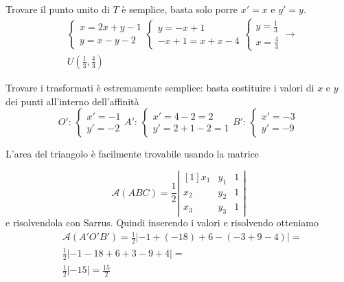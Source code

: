 Trovare il punto unito di $T$ è semplice, basta solo porre $x'=x$ e $y'=y$.
\begin{align*}
&\begin{cases}
x=2x+y-1\\
y=x-y-2
\end{cases}
\begin{cases}
y = -x+1\\
-x+1=x+x-4
\end{cases}
\begin{cases}
y=\frac{1}{3}\\
x=\frac{4}{3}
\end{cases}\rightarrow \\&U\left(\frac{1}{3},\frac{4}{3}\right)
\end{align*}

Trovare i trasformati è estremamente semplice: basta sostituire i valori di $x$ e $y$ dei punti
all'interno dell'affinità
\begin{equation*}
\boxed{
O':\,\begin{cases}
x'=-1\\y'=-2
\end{cases}
A':\,\begin{cases}
x'=4-2=2\\
y'=2+1-2=1
\end{cases}
B':\,\begin{cases}
x'=-3\\
y'=-9
\end{cases}
}	
\end{equation*}

L'area del triangolo è facilmente trovabile usando la matrice

\begin{equation*}
\mathscr{A}(ABC) = \frac{1}{2}\left\lvert 
\begin{matrix}[1]
x_1 & y_1 & 1\\
x_2 & y_2 & 1\\
x_3 & y_3 & 1
\end{matrix}\right\rvert
\end{equation*}
e risolvendola con Sarrus. Quindi inserendo i valori e risolvendo otteniamo
\begin{align*}
&\mathscr{A}(A'O'B') = \frac{1}{2}\left\lvert 
-1+(-18)+6-(-3+9-4)\right\rvert = \\&\frac{1}{2}\left\lvert 
-1-18+6+3-9+4\right\rvert = \\&\frac{1}{2}\left\lvert-15\right\rvert = \boxed{\frac{15}{2}}
\end{align*}

